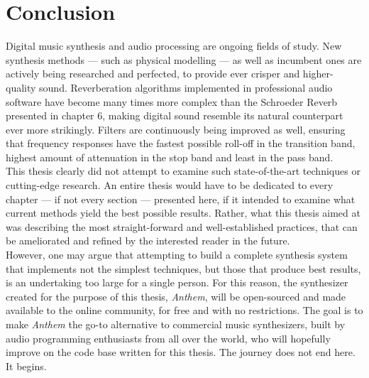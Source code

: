\chapter*{Conclusion}

Digital music synthesis and audio processing are ongoing fields of study. New synthesis methods --- such as physical modelling --- as well as incumbent ones are actively being researched and perfected, to provide ever crisper and higher-quality sound. Reverberation algorithms implemented in professional audio software have become many times more complex than the Schroeder Reverb presented in chapter 6, making digital sound resemble its natural counterpart ever more strikingly. Filters are continuously being improved as well, ensuring that frequency responses have the fastest possible roll-off in the transition band, highest amount of attenuation in the stop band and least in the pass band.\\

\noindent This thesis clearly did not attempt to examine such state-of-the-art techniques or cutting-edge research. An entire thesis would have to be dedicated to every chapter --- if not every section --- presented here, if it intended to examine what current methods yield the best possible results. Rather, what this thesis aimed at was describing the most straight-forward and well-established practices, that can be ameliorated and refined by the interested reader in the future. \\

\noindent However, one may argue that attempting to build a complete synthesis system that implements not the simplest techniques, but those that produce best results, is an undertaking too large for a single person. For this reason, the  synthesizer created for the purpose of this thesis, \emph{Anthem}, will be open-sourced and made available to the online community, for free and with no restrictions. The goal is to make \emph{Anthem} the go-to alternative to commercial music synthesizers, built by audio programming enthusiasts from all over the world, who will hopefully improve on the code base written for this thesis. The journey does not end here. It begins.
